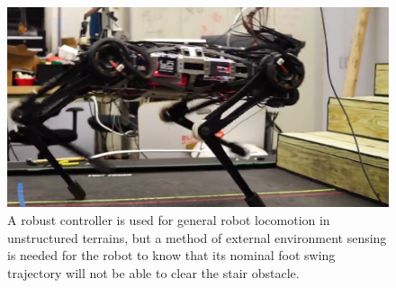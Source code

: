 \begin{figure}[t]
\centering
\includegraphics[width=\columnwidth]{Figures/RobotIntro.pdf}
\caption{A robust controller is used for general robot locomotion in unstructured terrains, but a method of external environment sensing is needed for the robot to know that its nominal foot swing trajectory will not be able to clear the stair obstacle.}
\label{fig:RI}
\end{figure}
